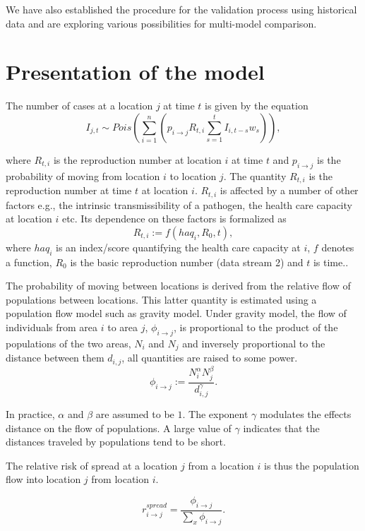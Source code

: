 \documentclass[11pt,]{article}
\begin{document}
We have also established the procedure for the validation process
using historical data and are exploring various possibilities for multi-model comparison.

\section{Presentation of the model}\label{sec:model}

The number of cases at a location \(j\) at time \(t\) is given by the equation
\[
  I_{j, t} \sim Pois\left( \sum_{i = 1}^{n} {\left( p_{i \rightarrow j}
  R_{t, i} \sum_{s = 1}^{t}{I_{i, t - s} w_{s}}\right)} \right),
\]

where \(R_{t, i}\) is the reproduction number at location \(i\) at time
\(t\) and \(p_{i \rightarrow j}\) is the probability of moving from
location \(i\) to location \(j\). The quantity $R_{t, i}$ is the
reproduction number at time $t$ at location $i$. $R_{t, i}$ is
affected by a number of other factors e.g., the intrinsic
transmissibility of a pathogen, the health care capacity at location
$i$ etc. Its dependence on these factors is formalized as
\[ R_{t, i} := f(haq_i, R_0, t),\]
where $haq_i$ is an index/score quantifying the health care capacity at
$i$, $f$ denotes a function, $R_0$ is the basic reproduction number (data stream 2) and $t$ is time..

The probability of moving between locations is derived from the relative flow of populations between
locations. This latter quantity is estimated using a population flow
model such as gravity model. Under gravity model, the flow of individuals from area \(i\) to area \(j\),
\(\phi_{i \rightarrow j}\), is proportional to the product of the
populations of the two areas, \(N_i\) and \(N_j\) and inversely
proportional to the distance between them \(d_{i, j}\), all quantities
are raised to some power.
\[
  \phi_{i \rightarrow j} :=  \frac{N_i^{\alpha}N_j^{\beta}}{d_{i, j}^{\gamma}}.
\]

In practice, \( \alpha \) and \( \beta \) are assumed to be $1$. The
exponent \( \gamma \) modulates the effects distance on the flow of
populations. A large value of \( \gamma \) indicates that the
distances traveled by populations tend to be short.

The relative risk of spread at a location \(j\) from a location \(i\)
is thus the population flow into location \(j\) from location \(i\).

\[
  r_{i \rightarrow j}^{spread} = \frac{\phi_{i \rightarrow
  j}}{\sum_{x}{\phi_{i \rightarrow
  j}}}.
\]
\end{document}
